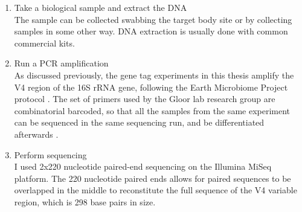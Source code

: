 \begin{enumerate}
\item Take a biological sample and extract the DNA\\
The sample can be collected swabbing the target body site or by collecting samples in some other way. DNA extraction is usually done with common commercial kits.

\item Run a PCR amplification\\
As discussed previously, the gene tag experiments in this thesis amplify the V4 region of the 16S rRNA gene, following the Earth Microbiome Project protocol \cite{caporaso2012ultra}. The set of primers used by the Gloor lab research group are combinatorial barcoded, so that all the samples from the same experiment can be sequenced in the same sequencing run, and be differentiated afterwards \cite{gloor2010microbiome}.

\item Perform sequencing\\
I used 2x220 nucleotide paired-end sequencing on the Illumina MiSeq platform. The 220 nucleotide paired ends allows for paired sequences to be overlapped in the middle to reconstitute the full sequence of the V4 variable region, which is 298 base pairs in size.
\end{enumerate}

